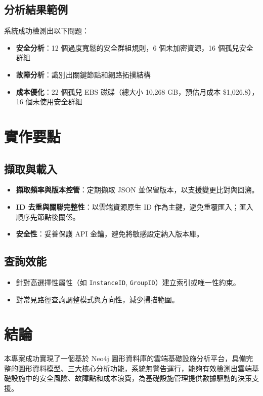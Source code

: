 \documentclass[11pt,a4paper]{ctexart}
\begin{document}
\subsection{分析結果範例}
系統成功檢測出以下問題：
\begin{itemize}[leftmargin=1.5em]
    \item \textbf{安全分析}：12 個過度寬鬆的安全群組規則，6 個未加密資源，16 個孤兒安全群組
    \item \textbf{故障分析}：識別出關鍵節點和網路拓撲結構
    \item \textbf{成本優化}：22 個孤兒 EBS 磁碟（總大小 10,268 GB，預估月成本 \$1,026.8），16 個未使用安全群組
\end{itemize}

\section{實作要點}
\subsection{擷取與載入}
\begin{itemize}[leftmargin=1.5em]
    \item \textbf{擷取頻率與版本控管}：定期擷取 JSON 並保留版本，以支援變更比對與回溯。
    \item \textbf{ID 去重與關聯完整性}：以雲端資源原生 ID 作為主鍵，避免重覆匯入；匯入順序先節點後關係。
    \item \textbf{安全性}：妥善保護 API 金鑰，避免將敏感設定納入版本庫。
\end{itemize}

\subsection{查詢效能}
\begin{itemize}[leftmargin=1.5em]
    \item 針對高選擇性屬性（如 \texttt{InstanceID}, \texttt{GroupID}）建立索引或唯一性約束。
    \item 對常見路徑查詢調整模式與方向性，減少掃描範圍。
\end{itemize}

\section{結論}
本專案成功實現了一個基於 Neo4j 圖形資料庫的雲端基礎設施分析平台，具備完整的圖形資料模型、三大核心分析功能，系統無警告運行，能夠有效檢測出雲端基礎設施中的安全風險、故障點和成本浪費，為基礎設施管理提供數據驅動的決策支援。
\end{document}
